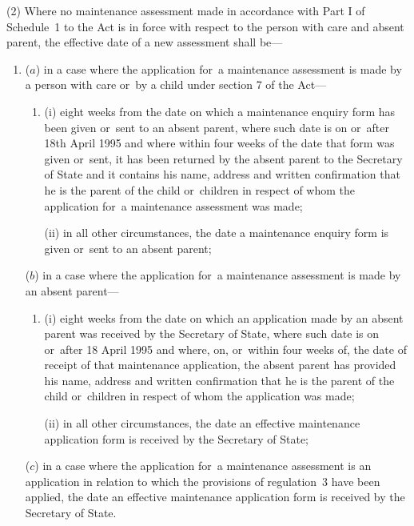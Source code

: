\documentclass[a4paper,12pt]{article}
\begin{document}
(2) Where no maintenance assessment made in accordance with Part I of Schedule~1 to the Act is in force with respect to the person with care and absent parent, the effective date of a new assessment shall be—
\begin{enumerate}\item[]
($a$) in a case where the application for~a maintenance assessment is made by a person with care or~by a child under section 7 of the Act—
\begin{enumerate}\item[]
(i) eight weeks from the date on which a maintenance enquiry form has been given or~sent to an absent parent, where such date is on or~after 18th April 1995 and where within four weeks of the date that form was given or~sent, it has been returned by the absent parent to the Secretary of State and it contains his name, address and written confirmation that he is the parent of the child or~children in respect of whom the application for~a maintenance assessment was made;

(ii) in all other circumstances, the date a maintenance enquiry form is given or~sent to an absent parent;
\end{enumerate}

($b$) in a case where the application for~a maintenance assessment is made by an absent parent—
\begin{enumerate}\item[]
(i) eight weeks from the date on which an application made by an absent parent was received by the Secretary of State, where such date is on or~after 18 April 1995 and where, on, or~within four weeks of, the date of receipt of that maintenance application, the absent parent has provided his name, address and written confirmation that he is the parent of the child or~children in respect of whom the application was made;

(ii) in all other circumstances, the date an effective maintenance application form is received by the Secretary of State;
\end{enumerate}

($c$) in a case where the application for~a maintenance assessment is an application in relation to which the provisions of regulation~3 have been applied, the date an effective maintenance application form is received by the Secretary of State.
\end{enumerate}
\end{document}
